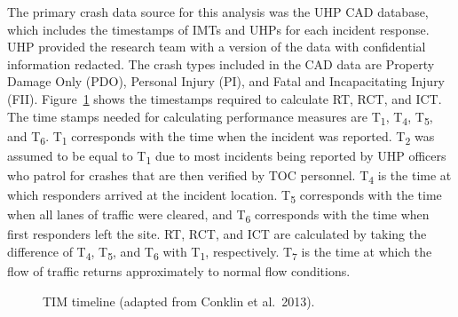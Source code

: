 \documentclass[
  letterpaper,
  authoryear]{elsarticle}
\begin{document}
The primary crash data source for this analysis was the UHP CAD
database, which includes the timestamps of IMTs and UHPs for each
incident response. UHP provided the research team with a version of the
data with confidential information redacted. The crash types included in
the CAD data are Property Damage Only (PDO), Personal Injury (PI), and
Fatal and Incapacitating Injury (FII). Figure~\ref{fig-TIM_Timeline}
shows the timestamps required to calculate RT, RCT, and ICT. The time
stamps needed for calculating performance measures are
T\textsubscript{1}, T\textsubscript{4}, T\textsubscript{5}, and
T\textsubscript{6}. T\textsubscript{1} corresponds with the time when
the incident was reported. T\textsubscript{2} was assumed to be equal to
T\textsubscript{1} due to most incidents being reported by UHP officers
who patrol for crashes that are then verified by TOC personnel.
T\textsubscript{4} is the time at which responders arrived at the
incident location. T\textsubscript{5} corresponds with the time when all
lanes of traffic were cleared, and T\textsubscript{6} corresponds with
the time when first responders left the site. RT, RCT, and ICT are
calculated by taking the difference of T\textsubscript{4},
T\textsubscript{5}, and T\textsubscript{6} with T\textsubscript{1},
respectively. T\textsubscript{7} is the time at which the flow of
traffic returns approximately to normal flow conditions.

\begin{figure}


\caption{\label{fig-TIM_Timeline}TIM timeline (adapted from Conklin et
al.~2013).}

\end{figure}%
\end{document}
